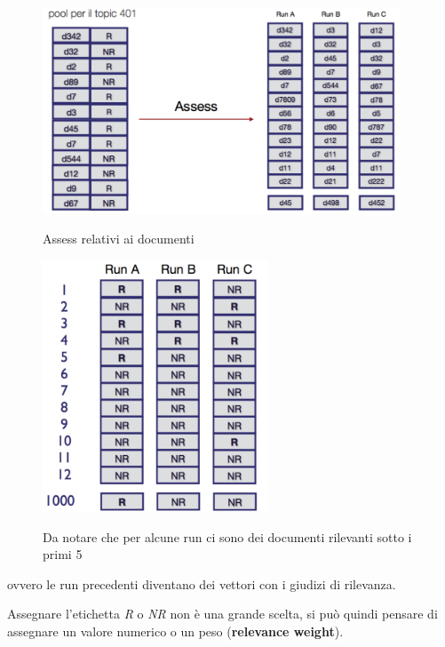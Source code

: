 \begin{figure}[ht]
\centering
\begin{minipage}[b]{0.45\linewidth}
	\centering
  \includegraphics[width=0.95\textwidth]{images/l14-fig-5.png}
  \label{fig:minipage1}
  \caption{Assess relativi ai documenti}
\end{minipage}
\quad
\begin{minipage}[b]{0.45\linewidth}
	\centering
  \includegraphics[width=0.6\textwidth]{images/l14-fig-6.png}
  \label{fig:minipage2}
  \caption{Da notare che per alcune run ci sono dei documenti rilevanti sotto i primi 5}
\end{minipage}
\end{figure}

\noindent ovvero le run precedenti diventano dei vettori con i giudizi di rilevanza.

Assegnare l'etichetta \textit{R} o \textit{NR} non è una grande scelta, si può quindi pensare di assegnare un valore numerico o un peso (\textbf{relevance weight}).

